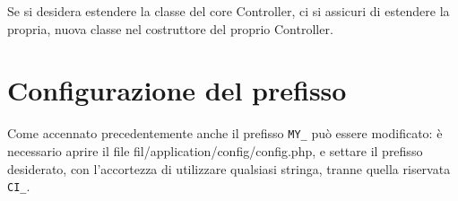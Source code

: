 Se si desidera estendere la classe del core Controller, ci si assicuri di estendere la propria, nuova classe nel costruttore del proprio Controller.


\section*{Configurazione del prefisso}
Come accennato precedentemente anche il prefisso \verb|MY_| può essere modificato: è necessario aprire il file fil{/application/config/config.php}, e settare il prefisso desiderato, con l'accortezza di utilizzare qualsiasi stringa, tranne quella riservata \verb|CI_|.

